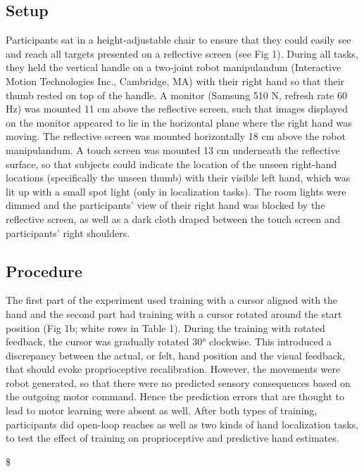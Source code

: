 \documentclass[10pt,letterpaper]{article}
\begin{document}
\subsection{Setup}\label{setup}

Participants sat in a height-adjustable chair to ensure that they could
easily see and reach all targets presented on a reflective screen (see
Fig 1). During all tasks, they held the vertical handle on a two-joint
robot manipulandum (Interactive Motion Technologies Inc., Cambridge, MA)
with their right hand so that their thumb rested on top of the handle. A
monitor (Samsung 510 N, refresh rate 60 Hz) was mounted 11 cm above the
reflective screen, such that images displayed on the monitor appeared to
lie in the horizontal plane where the right hand was moving. The
reflective screen was mounted horizontally 18 cm above the robot
manipulandum. A touch screen was mounted 13 cm underneath the reflective
surface, so that subjects could indicate the location of the unseen
right-hand locations (specifically the unseen thumb) with their visible
left hand, which was lit up with a small spot light (only in
localization tasks). The room lights were dimmed and the participants'
view of their right hand was blocked by the reflective screen, as well
as a dark cloth draped between the touch screen and participants' right
shoulders.

\subsection{Procedure}\label{procedure}

The first part of the experiment used training with a cursor aligned
with the hand and the second part had training with a cursor rotated
around the start position (Fig 1b; white rows in Table 1). During the
training with rotated feedback, the cursor was gradually rotated 30°
clockwise. This introduced a discrepancy between the actual, or felt,
hand position and the visual feedback, that should evoke proprioceptive
recalibration. However, the movements were robot generated, so that
there were no predicted sensory consequences based on the outgoing motor
command. Hence the prediction errors that are thought to lead to motor
learning were absent as well. After both types of training, participants
did open-loop reaches as well as two kinds of hand localization tasks,
to test the effect of training on proprioceptive and predictive hand
estimates.

\$

\newcommand{\headrow}{\rowcolor{black!20}}
\newcommand{\thead}[1]{\multicolumn{1}{l}{\bfseries #1\rule[-1.2ex]{0pt}{2em}}}
\end{document}
